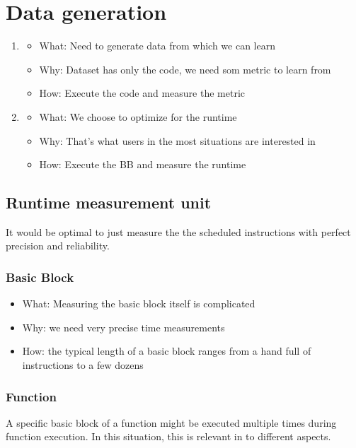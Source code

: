 \section{Data generation}
\begin{enumerate}
    \item 
    \begin{itemize}
        \item What: Need to generate data from which we can learn
        \item Why: Dataset has only the code, we need som metric to learn from
        \item How: Execute the code and measure the metric
    \end{itemize}
    \item
    \begin{itemize}
        \item What: We choose to optimize for the runtime
        \item Why: That's what users in the most situations are interested in
        \item How: Execute the BB and measure the runtime
    \end{itemize}
\end{enumerate}

\subsection{Runtime measurement unit}
It would be optimal to just measure the the scheduled instructions with perfect precision and reliability.
\subsubsection{Basic Block}
\begin{itemize}
    \item What: Measuring the basic block itself is complicated
    \item Why: we need very precise time measurements
    \item How: the typical length of a basic block ranges from a hand full of instructions to a few dozens
\end{itemize}
\subsubsection{Function}
A specific basic block of a function might be executed multiple times during function execution.
In this situation, this is relevant in to different aspects.

